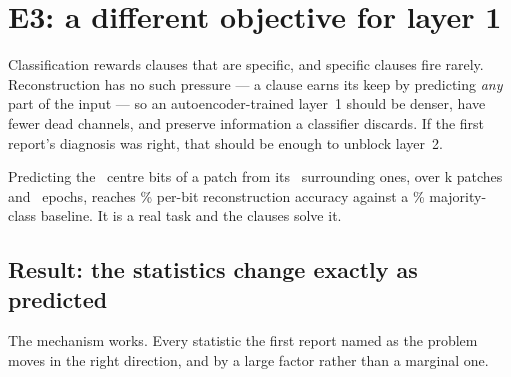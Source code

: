 \section{E3: a different objective for layer 1}
\label{sec:objective}

 Classification rewards clauses that are specific, and specific clauses
fire rarely. Reconstruction has no such pressure --- a clause earns its keep by predicting
\emph{any} part of the input --- so an autoencoder-trained layer~1 should be denser, have
fewer dead channels, and preserve information a classifier discards. If the first report's
diagnosis was right, that should be enough to unblock layer~2.

 Predicting the \aeTarget\ centre bits of a patch from its
\aeContext\ surrounding ones, over \aePatches{}k patches and \aeEpochs\ epochs, reaches
\aeRecon{}\% per-bit reconstruction accuracy against a \aeBaseline{}\% majority-class
baseline. It is a real task and the clauses solve it.

\subsection{Result: the statistics change exactly as predicted}

\begin{table}[h]
\centering\small
\caption{Layer-1 statistics by objective, measured on 5000 training images.
 is the median per-channel firing rate of the $\poolK\times\poolK$ OR-pooled map ---
what layer~2 actually sees ---  the fraction of channels that never fire,
 the median clause size, and  the mean fraction of each clause's
literals that are negations.}
\label{tab:l1stats}
\end{table}

The mechanism works. Every statistic the first report named as the problem moves in the right
direction, and by a large factor rather than a marginal one.

